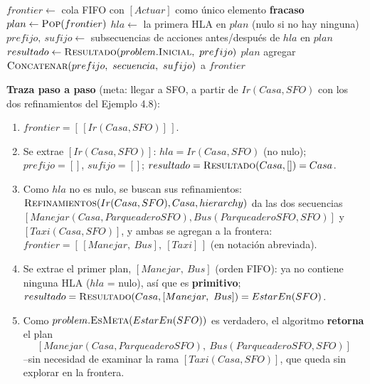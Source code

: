 \begin{algorithm}[H]
\caption{HIERARCHICAL-SEARCH($problem$, $hierarchy$) --- búsqueda jerárquica en anchura}
\begin{algorithmic}[1]
\State $frontier \gets$ cola FIFO con $[Actuar]$ como único elemento
     \Return \textbf{fracaso} \EndIf
    \State $plan \gets \Call{Pop}{frontier}$ 
    \State $hla \gets$ la primera HLA en $plan$ (nulo si no hay ninguna)
    \State $prefijo,\ sufijo \gets$ subsecuencias de acciones antes/después de $hla$ en $plan$
    \State $resultado \gets \textsc{Resultado}(problem.\textsc{Inicial},\ prefijo)$
     
         \Return $plan$ \EndIf
    \Else
            \State agregar $\textsc{Concatenar}(prefijo,\ secuencia,\ sufijo)$ a $frontier$
        \EndFor
    \EndIf
\EndWhile
\end{algorithmic}
\end{algorithm}

\textbf{Traza paso a paso} (meta: llegar a SFO, a partir de $Ir(Casa,SFO)$ con los dos refinamientos
del Ejemplo 4.8):
\begin{enumerate}
    \item $frontier = [\,[Ir(Casa,SFO)]\,]$.
    \item Se extrae $[Ir(Casa,SFO)]$: $hla=Ir(Casa,SFO)$ (no nulo); $prefijo=[]$, $sufijo=[]$;
    $resultado = \textsc{Resultado}(Casa,[]) = Casa$.
    \item Como $hla$ no es nulo, se buscan sus refinamientos:
    $\textsc{Refinamientos}(Ir(Casa,SFO),Casa,hierarchy)$ da las dos secuencias
    $[Manejar(Casa,ParqueaderoSFO),Bus(ParqueaderoSFO,SFO)]$ y $[Taxi(Casa,SFO)]$, y ambas se
    agregan a la frontera: $frontier = [\,[Manejar,\ Bus],\ [Taxi]\,]$ (en notación abreviada).
    \item Se extrae el primer plan, $[Manejar,\ Bus]$ (orden FIFO): ya no contiene ninguna HLA
    ($hla$ = nulo), así que es \textbf{primitivo}; $resultado = \textsc{Resultado}(Casa,[Manejar,\
    Bus]) = EstarEn(SFO)$.
    \item Como $problem.\textsc{EsMeta}(EstarEn(SFO))$ es verdadero, el algoritmo \textbf{retorna}
    el plan
    \[
        [Manejar(Casa,ParqueaderoSFO),\ Bus(ParqueaderoSFO,SFO)]
    \]
    --sin necesidad de examinar la rama $[Taxi(Casa,SFO)]$, que queda sin explorar en la frontera.
\end{enumerate}

